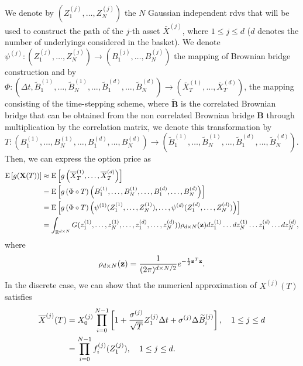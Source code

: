 We denote by $(Z_1^{(j)},\dots,Z_N^{(j)})$ the $N$ Gaussian independent rdvs that will be used to construct the path of the $j$-th asset $\bar{X}^{(j)}$, where $1 \le j \le d$ ($d$ denotes the number of underlyings considered in the basket). We denote  $\psi^{(j)}: (Z_1^{(j)},\dots,Z_N^{(j)}) \rightarrow (B_1^{(j)},\dots,B_N^{(j)})$ the mapping of Brownian bridge construction and by $\Phi: (\Delta t, \widetilde{B}^{(1)}_1,\dots,\widetilde{B}^{(1)}_N,\dots, \widetilde{B}^{(d)}_1,\dots,\widetilde{B}^{(d)}_N) \rightarrow \left(\bar{X}^{(1)}_T,\dots,\bar{X}^{(d)}_T \right)$, the mapping consisting of the time-stepping scheme, where $\widetilde{\mathbf{B}}$ is the correlated Brownian bridge that can be obtained from the non correlated Brownian bridge $\mathbf{B}$ through multiplication by the correlation matrix, we denote this transformation by $T: \left(B^{(1)}_1,\dots,B^{(1)}_N,\dots, B^{(d)}_1,\dots,B^{(d)}_N \right) \rightarrow \left(\widetilde{B}^{(1)}_1,\dots,\widetilde{B}^{(1)}_N,\dots, \widetilde{B}^{(d)}_1,\dots,\widetilde{B}^{(d)}_N\right)$. Then, we can express the option price as
\begin{align}\label{eq: option price as integral_basket}
	\mathrm{E}\left[g(\mathbf{X}(T))\right]&\approx	\mathrm{E}\left[g\left(\overline{X}_T^{(1)}, \dots,\overline{X}_T^{(d)} \right)\right] \nonumber\\
	&=\mathrm{E}\left[g\left(\Phi\circ T\right) \left(B^{(1)}_1,\dots,B^{(1)}_N,\dots, B^{(d)}_1,\dots,B^{(d)}_N \right)\right] \nonumber\\
		&=\mathrm{E}\left[g\left(\Phi \circ T \right) \left(\psi^{(1)}(Z_1^{(1)}, \dots, Z_N^{(1)}), \dots, \psi^{(d)}(Z_1^{(d)},\dots,Z^{(d)}_N)\right)\right] \nonumber\\
	&=\int_{\mathbb{R}^{d \times N}} G(z_1^{(1)}, \dots, z_N^{(1)}, \dots, z_1^{(d)},\dots,z^{(d)}_N)) \rho_{d \times N}(\mathbf{z}) dz_1^{(1)} \dots dz_N^{(1)} \dots z_1^{(d)} \dots dz^{(d)}_N ,
\end{align}
where 
\begin{equation*}
\rho_{d \times N}(\mathbf{z})=\frac{1}{(2 \pi)^{{d \times N}/2}} e^{-\frac{1}{2} \mathbf{z}^T \mathbf{z}} .
\end{equation*}
In the discrete case, we can show that the numerical approximation of $X^{(j)}(T)$ satisfies
\begin{align}\label{eq:discrete_rep}
	\overline{X}^{(j)}(T)&=X_0^{(j)} \prod_{i=0}^{N-1} \left[ 1+\frac{\sigma^{(j)}}{\sqrt{T}} Z^{(j)}_1 \Delta t+ \sigma^{(j)} \Delta \widetilde{B}^{(j)}_{i}\right], \quad 1 \le j \le d \nonumber\\
	&= \prod_{i=0}^{N-1} f_i^{(j)}(Z^{(j)}_1) , \quad 1 \le j \le d .
\end{align}
